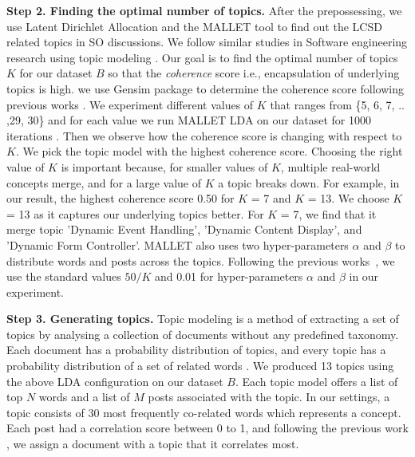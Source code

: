 \nd\textbf{Step 2. Finding the optimal number of topics.}  After the prepossessing, we use Latent Dirichlet Allocation  \cite{blei2003latent} and the MALLET tool \cite{mccallum2002mallet} to find out the  LCSD related topics in SO discussions. We follow similar studies in Software engineering research using topic modeling \cite{arun2010finding, asuncion2010software, yang2016security, bagherzadeh2019going,abdellatif2020challenges}. Our goal is to find the optimal number of topics $K$ for our dataset $B$ so that the \textit{coherence} score i.e., encapsulation of underlying topics is high. we use Gensim package \cite{rehurek2010software} to determine the coherence score following previous works \cite{uddin2017automatic, roder2015exploring}. We experiment different values of $K$ that ranges from \{5, 6, 7, .. ,29, 30\} and for each value we run  MALLET LDA on our dataset for 1000 iterations \cite{bagherzadeh2019going}. Then we observe how the coherence score is changing with respect to $K$. We pick the topic model with the highest coherence score. Choosing the right value of $K$ is important because, for smaller values of $K$, multiple real-world concepts merge, and for a large value of $K$ a topic breaks down. For example, in our result, the highest coherence score 0.50  for $K$ = 7 and $K$ = 13. We choose $K$ = 13 as it captures our underlying topics better. For $K$ = 7, we find that it merge topic 'Dynamic Event Handling', 'Dynamic Content Display', and 'Dynamic Form Controller'. MALLET also uses two hyper-parameters $\alpha$ and $\beta$ to distribute words and posts across the topics. Following the previous works~\cite{bagherzadeh2019going, ahmed2018concurrency, bajaj2014mining, rosen2016mobile}, we use the standard values $50/K$ and 0.01 for hyper-parameters $\alpha$ and $\beta$ in our experiment.  

\nd\textbf{Step 3. Generating topics.} Topic modeling is a method of extracting a set of topics by analysing a collection of documents without any predefined taxonomy. Each document has a probability distribution of topics, and every topic has a probability distribution of a set of related words \cite{barua2014developers}. We produced 13 topics using the above LDA configuration on our dataset $B$. Each topic model offers a list of top $N$ words and a list of $M$ posts associated with the topic. In our settings, a topic consists of 30 most frequently co-related words which represents a concept. Each post had a correlation score between 0 to 1, and following the previous work \cite{wan2019discussed}, we assign a document with a topic that it correlates most.  







